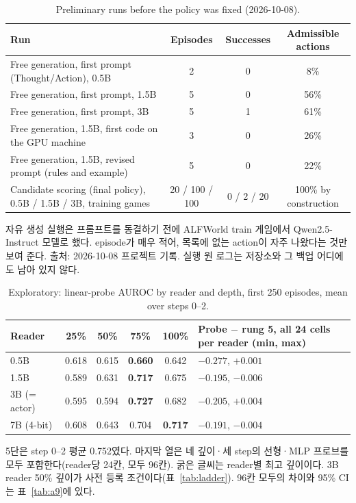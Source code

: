 \documentclass[11pt]{article}
\begin{document}
\begin{table}[h]
\centering\small
\caption{Preliminary runs before the policy was fixed (2026-10-08).}\label{tab:a5}
\begin{tabularx}{\linewidth}{@{}Lccc@{}}
\toprule
Run & Episodes & Successes & Admissible actions \\
\midrule
Free generation, first prompt (Thought/Action), 0.5B & 2 & 0 & 8\% \\
Free generation, first prompt, 1.5B & 5 & 0 & 56\% \\
Free generation, first prompt, 3B & 5 & 1 & 61\% \\
Free generation, 1.5B, first code on the GPU machine & 3 & 0 & 26\% \\
Free generation, 1.5B, revised prompt (rules and example) & 5 & 0 & 22\% \\
Candidate scoring (final policy), 0.5B / 1.5B / 3B, training games & 20 / 100 / 100 & 0 / 2 / 20 & 100\% by construction \\
\bottomrule
\end{tabularx}
\par\smallskip\raggedright\footnotesize
자유 생성 실행은 프롬프트를 동결하기 전에 ALFWorld train 게임에서 Qwen2.5-Instruct 모델로 했다. episode가 매우 적어, 목록에 없는 action이 자주 나왔다는 것만 보여 준다. 출처: 2026-10-08 프로젝트 기록. 실행 원 로그는 저장소와 그 백업 어디에도 남아 있지 않다.
\end{table}

\begin{table}[h]
\centering\small
\caption{Exploratory: linear-probe AUROC by reader and depth, first 250 episodes, mean over steps 0--2.}\label{tab:a6}
\begin{tabularx}{\linewidth}{@{}lccccL@{}}
\toprule
Reader & 25\% & 50\% & 75\% & 100\% & Probe $-$ rung 5, all 24 cells per reader (min, max) \\
\midrule
0.5B & 0.618 & 0.615 & \textbf{0.660} & 0.642 & $-0.277$, $+0.001$ \\
1.5B & 0.589 & 0.631 & \textbf{0.717} & 0.675 & $-0.195$, $-0.006$ \\
3B (= actor) & 0.595 & 0.594 & \textbf{0.727} & 0.682 & $-0.205$, $+0.004$ \\
7B (4-bit) & 0.608 & 0.643 & 0.704 & \textbf{0.717} & $-0.191$, $-0.004$ \\
\bottomrule
\end{tabularx}
\par\smallskip\raggedright\footnotesize
5단은 step 0--2 평균 0.752였다. 마지막 열은 네 깊이·세 step의 선형·MLP 프로브를 모두 포함한다(reader당 24칸, 모두 96칸). 굵은 글씨는 reader별 최고 깊이이다. 3B reader 50\% 깊이가 사전 등록 조건이다(표~\ref{tab:ladder}). 96칸 모두의 차이와 95\% CI는 표~\ref{tab:a9}에 있다.
\end{table}
\end{document}
